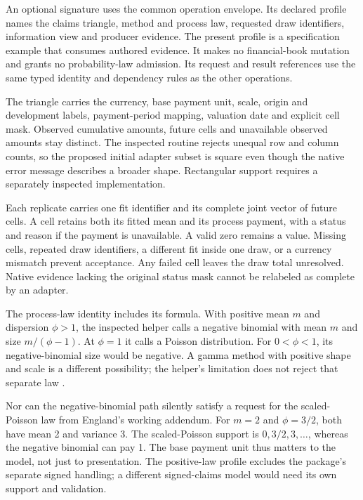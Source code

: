 An optional  signature uses the common operation
envelope. Its declared profile names the claims triangle, method and process
law, requested draw identifiers, information view and producer evidence.
The present profile is a specification example that consumes authored
evidence. It makes no financial-book mutation and grants no probability-law
admission. Its request and result references use the same typed identity and
dependency rules as the other operations.

The triangle carries the currency, base payment unit, scale, origin and
development labels, payment-period mapping, valuation date and explicit cell
mask. Observed cumulative amounts, future cells and unavailable observed
amounts stay distinct. The inspected routine rejects unequal row and column
counts, so the proposed initial adapter subset is square even though the
native error message describes a broader shape. Rectangular support requires
a separately inspected implementation.

Each replicate carries one fit identifier and its complete joint vector of
future cells. A cell retains both its fitted mean and its process payment,
with a status and reason if the payment is unavailable. A valid zero remains
a value. Missing cells, repeated draw identifiers, a different fit inside one
draw, or a currency mismatch prevent acceptance. Any failed cell leaves the
draw total unresolved. Native evidence lacking the original status mask cannot
be relabeled as complete by an adapter.

The process-law identity includes its formula. With positive mean $m$ and
dispersion $\phi>1$, the inspected  helper calls a negative
binomial with mean $m$ and size $m/(\phi-1)$. At $\phi=1$ it calls a
Poisson distribution. For $0<\phi<1$, its negative-binomial size would be
negative. A gamma method with positive shape and scale is a different
possibility; the helper's limitation does not reject that separate law
\citep[ and the process-law branches]{chainladder2023snapshot}.

Nor can the negative-binomial path silently satisfy a request for the
scaled-Poisson law from England's working addendum. For $m=2$ and
$\phi=3/2$, both have mean 2 and variance 3. The scaled-Poisson support
is $0,3/2,3,\ldots$, whereas the negative binomial can pay 1.
The base payment unit thus matters to the model, not just to presentation.
The positive-law profile excludes the package's separate signed handling;
a different signed-claims model would need its own support and validation.

